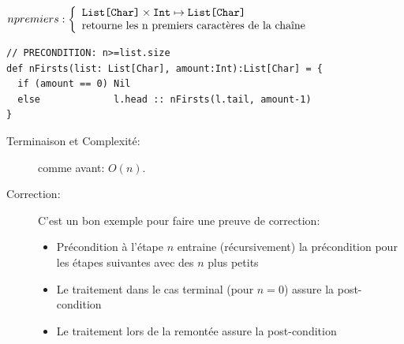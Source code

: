 \documentclass[10pt]{article}\usepackage[correction,nu]{esial}
\begin{document}
\begin{Question}
  $npremiers: \left\{
    \begin{array}{l}
      \text{\texttt{List[Char]}}\times\text{\texttt{Int}}\mapsto \text{\texttt{List[Char]}}\\
      \text{retourne les n premiers caractères de la chaîne}
    \end{array}\right.$  
\end{Question}
\begin{Reponse}
  \begin{Verbatim}
// PRECONDITION: n>=list.size
def nFirsts(list: List[Char], amount:Int):List[Char] = {
  if (amount == 0) Nil
  else             l.head :: nFirsts(l.tail, amount-1)
}
  \end{Verbatim}
  \begin{description}
  \item[Terminaison et Complexité:] comme avant: $O(n)$.
  \item[Correction:] C'est un bon exemple pour faire une preuve de correction:
    \begin{itemize}
    \item Précondition à l'étape $n$ entraine (récursivement) la précondition
      pour les étapes suivantes avec des $n$ plus petits
    \item Le traitement dans le cas terminal (pour $n=0$) assure la
      post-condition
    \item Le traitement lors de la remontée assure la post-condition
    \end{itemize}
  \end{description}
\end{Reponse}
\end{document}
